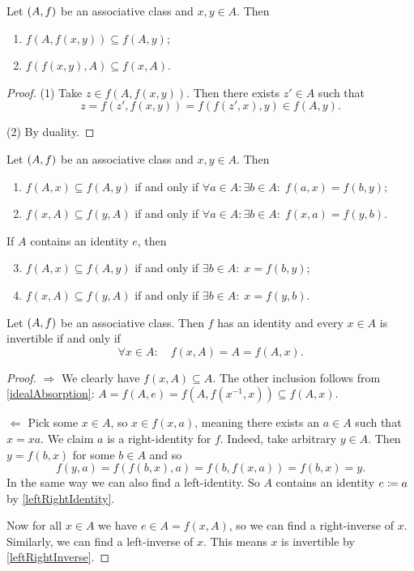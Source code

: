 \begin{lemma} \label{idealAbsorption}
Let $\left( A, f \right)$ be an associative class and $x, y\in A$. Then
\begin{enumerate}
\item $f(A, f(x,y)) \subseteq f(A, y)$;
\item $f(f(x,y), A) \subseteq f(x, A)$.
\end{enumerate}
\end{lemma}
\begin{proof}
(1) Take $z\in f(A, f(x,y))$. Then there exists $z'\in A$ such that
\[ z = f(z', f(x,y)) = f(f(z', x), y) \in f(A, y). \]

(2) By duality.
\end{proof}

\begin{lemma}
Let $\left( A, f \right)$ be an associative class and $x, y\in A$. Then
\begin{enumerate}
\item $f(A, x) \subseteq f(A,y)$ \textup{if and only if} $\forall a\in A: \exists b\in A: \; f(a, x) = f(b, y)$;
\item $f(x, A) \subseteq f(y, A)$ \textup{if and only if} $\forall a\in A: \exists b\in A: \; f(x, a) = f(y, b)$.
\end{enumerate}
If $A$ contains an identity $e$, then
\begin{enumerate} \setcounter{enumi}{2}
\item $f(A, x) \subseteq f(A,y)$ \textup{if and only if} $\exists b\in A: \; x = f(b, y)$;
\item $f(x, A) \subseteq f(y, A)$ \textup{if and only if} $\exists b\in A: \; x = f(y, b)$.
\end{enumerate}
\end{lemma}

\begin{proposition} \label{invertibilityFromPrincipalIdeals}
Let $\left( A, f \right)$ be an associative class. Then $f$ has an identity and every $x\in A$ is invertible \textup{if and only if}
\[ \forall x\in A: \quad f(x, A) = A = f(A,x). \]
\end{proposition}
\begin{proof}
$\Rightarrow$ We clearly have $f(x, A) \subseteq A$. The other inclusion follows from \ref{idealAbsorption}: $A = f(A, e) = f(A, f(x^{-1}, x)) \subseteq f(A, x)$.

$\Leftarrow$ Pick some $x\in A$, so $x\in f(x,a)$, meaning there exists an $a\in A$ such that $x = xa$. We claim $a$ is a right-identity for $f$. Indeed, take arbitrary $y\in A$. Then $y = f(b,x)$ for some $b\in A$ and so
\[ f(y, a) = f(f(b,x), a) = f(b,f(x,a)) = f(b,x) = y. \]
In the same way we can also find a left-identity. So $A$ contains an identity $e \coloneqq a$ by \ref{leftRightIdentity}.

Now for all $x\in A$ we have $e\in A = f(x,A)$, so we can find a right-inverse of $x$. Similarly, we can find a left-inverse of $x$. This means $x$ is invertible by \ref{leftRightInverse}.
\end{proof}


